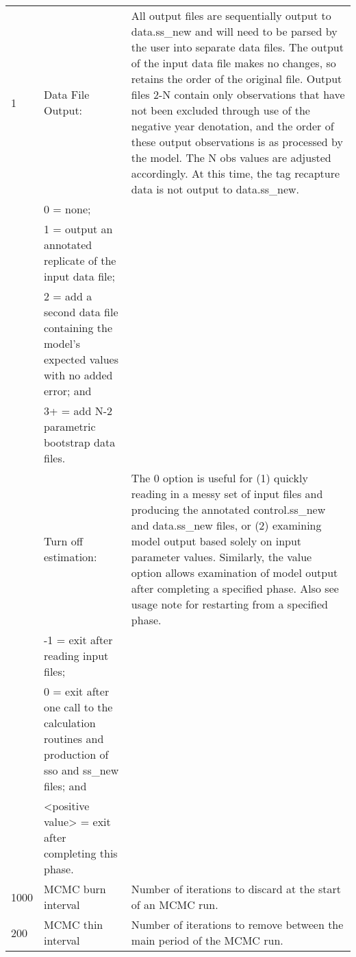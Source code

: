 {\begin{landscape}
\begin{longtable}{p{1.5cm} p{7.2cm} p{12.3cm}}
 
 \hline
 1 & Data File Output: & \multirow{1}{1cm}[-0.25cm]{\parbox{12.5cm}{All output files are sequentially output to data.ss\_new and will need to be parsed by the user into separate data files. The output of the input data file makes no changes, so retains the order of the original file. Output files 2-N contain only observations that have not been excluded through use of the negative year denotation, and the order of these output observations is as processed by the model. The N obs values are adjusted accordingly.  At this time, the tag recapture data is not output to data.ss\_new.}}\Tstrut\\
   & 0 = none; & \\
   & 1 = output an annotated replicate of the input data file; & \\
   & 2 = add a second data file containing the model's expected values with no added error; and & \\
   & 3+ = add N-2 parametric bootstrap data files. & \\

 \pagebreak
 8 & Turn off estimation: &  \multirow{1}{1cm}[-0.25cm]{\parbox{12.5cm}{The 0 option is useful for (1) quickly reading in a messy set of input files and producing the annotated control.ss\_new and data.ss\_new files, or (2) examining model output based solely on input parameter values.  Similarly, the value option allows examination of model output after completing a specified phase.  Also see usage note for restarting from a specified phase.}}\Tstrut\\
   & -1 = exit after reading input files; & \\
   & 0 = exit after one call to the calculation routines and production of sso and ss\_new files; and & \\
   & <positive value> = exit after completing this phase. & \\	  
	     
 \hline
 1000 & MCMC burn interval & Number of iterations to discard at the start of an MCMC run. \Tstrut\\
	   
 \hline
 200 & MCMC thin interval & Number of iterations to remove between the main period of the MCMC run. \Tstrut\\
	   

\end{longtable}
\end{landscape}}
